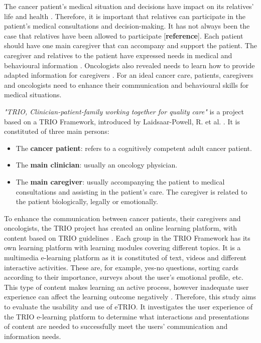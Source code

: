 \documentclass{sigchi}
\begin{document}
The cancer patient’s medical situation and decisions have impact on its relatives’ life and health \cite{Bevans2012}. Therefore, it is important that relatives can participate in the patient’s medical consultations and decision-making. It has not always been the case that relatives have been allowed to participate [\textbf{reference}]. Each patient should have one main caregiver that can accompany and support the patient. The caregiver and relatives to the patient have expressed needs in medical and behavioural information \cite{Lamore2017}. Oncologists also revealed needs to learn how to provide adapted information for caregivers \cite{Stuij2018}. For an ideal cancer care, patients, caregivers and oncologists need to enhance their communication and behavioural skills for medical situations. 

\textit{"TRIO, Clinician-patient-family working together for quality care"} is a project based on a TRIO Framework, introduced by Laidsaar-Powell, R. et al. \cite{Laidsaar-Powell2017}. It is constituted of three main persons:

\begin{itemize}[noitemsep]
    \item The \textbf{cancer patient}: refers to a cognitively competent adult cancer patient.
    \item The \textbf{main clinician}: usually an oncology physician.
    \item The \textbf{main caregiver}: usually accompanying the patient to medical consultations and assisting in the patient’s care. The caregiver is related to the patient biologically, legally or emotionally.
\end{itemize}

To enhance the communication between cancer patients, their caregivers and oncologists, the TRIO project has created an online learning platform, with content based on TRIO guidelines \cite{Laidsaar-Powell2018a, Laidsaar-Powell2018}. Each group in the TRIO Framework has its own learning platform with learning modules covering different topics. It is a multimedia e-learning platform as it is constituted of text, videos and different interactive activities. These are, for example, yes-no questions, sorting cards according to their importance, surveys about the user’s emotional profile, etc. This type of content makes learning an active process, however inadequate user experience can affect the learning outcome negatively \cite{Huang2005}. Therefore, this study aims to evaluate the usability and use of eTRIO. It investigates the user experience of the TRIO e-learning platform to determine what interactions and presentations of content are needed to successfully meet the users' communication and information needs.
\end{document}
